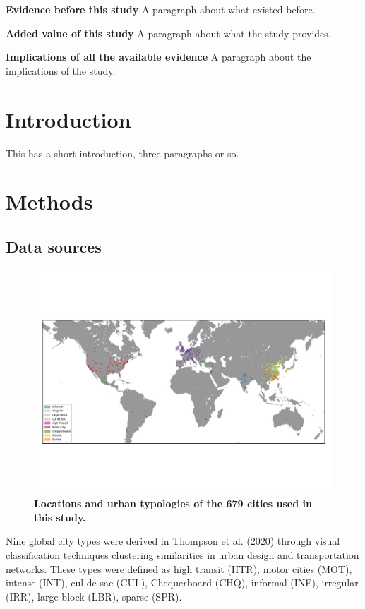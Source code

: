 \documentclass[preprint,12pt]{elsarticle}
\begin{document}
\textbf{Evidence before this study} 
A paragraph about what existed before.

\textbf{Added value of this study} 
A paragraph about what the study provides.

\textbf{Implications of all the available evidence} 
A paragraph about the implications of the study.

\section*{Introduction}
This has a short introduction, three paragraphs or so.

\section*{Methods}

\subsection*{Data sources}


\begin{figure}
\centering
\includegraphics[trim={13 78 13 78},clip,scale=0.9]{Images/WorldPollutionClusters.png}
\caption{\bf Locations and urban typologies of the 679 cities used in this study.}
 \label{fig:clusters}
\end{figure}




Nine global city types were derived in Thompson et al. (2020) \cite{Thompson2020} through visual classification techniques clustering similarities in urban design and transportation networks. These types were defined as high transit (HTR), motor cities (MOT), intense (INT), cul de sac (CUL), Chequerboard (CHQ), informal (INF), irregular (IRR), large block (LBR), sparse (SPR). 
\end{document}
